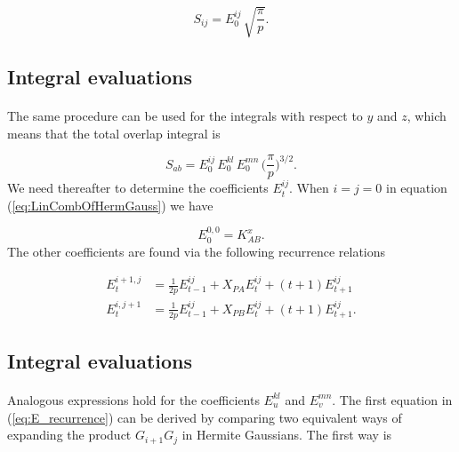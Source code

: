 \documentclass[%
twoside,                 %
final,                   %
10pt]{article}
\begin{document}
\begin{equation}
 S_{ij} = E^{ij}_0\,\sqrt{\frac{\pi}{p}}.
\end{equation}



\subsection{Integral evaluations}

\paragraph{}

The same procedure can be used for the integrals with respect to $y$ and $z$, which means that the total overlap integral is

\begin{equation}
 S_{ab} = E^{ij}_0\,E^{kl}_0\,E^{mn}_0\,\Big(\frac{\pi}{p}\Big)^{3/2}.
\end{equation}
We need thereafter to determine the coefficients $E^{ij}_t$. When $i=j=0$ in equation (\ref{eq:LinCombOfHermGauss})
we have

\begin{equation}
 E^{0,0}_0 = K_{AB}^x.
\end{equation}
The other coefficients are found via the following recurrence relations

\begin{equation}
\label{eq:E_recurrence}
\begin{split}
 E^{i+1,j}_t & = \frac{1}{2p}E^{ij}_{t-1} + X_{PA}E^{ij}_t + (t+1)E^{ij}_{t+1} \\
 E^{i,j+1}_t & = \frac{1}{2p}E^{ij}_{t-1} + X_{PB}E^{ij}_t + (t+1)E^{ij}_{t+1}.
\end{split}
\end{equation}



\subsection{Integral evaluations}

\paragraph{}

Analogous expressions hold for the coefficients $E^{kl}_u$ and $E^{mn}_v$. The first equation in (\ref{eq:E_recurrence}) 
can be derived by comparing two equivalent ways of expanding the product $G_{i+1}G_j$
in Hermite Gaussians. The first way is
\end{document}
